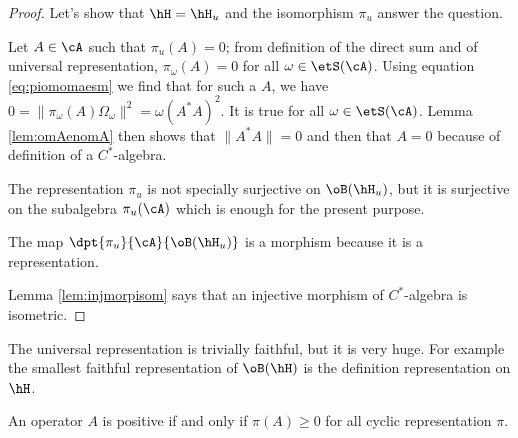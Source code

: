\begin{proof}
Let's show that $\hH=\hH_u$ and the isomorphism $\pi_u$ answer the question.

Let $A\in\cA$ such that $\pi_u(A)=0$; from definition of the direct sum and of universal representation,  $\pi_{\omega}(A)=0$ for all $\omega\in\etS(\cA)$. Using equation \eqref{eq:piomomaesm} we find that for such a $A$, we have $0=\| \pi_{\omega}(A)\Omega_{\omega} \|^2=\omega(A^*A)^2$. It is true for all $\omega\in\etS(\cA)$. Lemma \ref{lem:omAenomA} then shows that $\| A^*A \|=0$ and then that $A=0$ because of definition of a $C^*$-algebra. 

The representation $\pi_u$ is not specially surjective on $\oB(\hH_u)$, but it is surjective on the subalgebra $\pi_u(\cA)$ which is enough for the present purpose.

The map $\dpt{\pi_u}{\cA}{\oB(\hH_u)}$ is a morphism because it is a representation.


Lemma \ref{lem:injmorpisom} says that an injective morphism of $C^*$-algebra is isometric.

\end{proof}

The universal representation is trivially faithful, but it is very huge. For example the smallest faithful representation of $\oB(\hH)$ is the definition representation on $\hH$.

\begin{corollary}
An operator $A$ is positive if and only if $\pi(A)\geq 0$ for all cyclic representation $\pi$.
\end{corollary}

